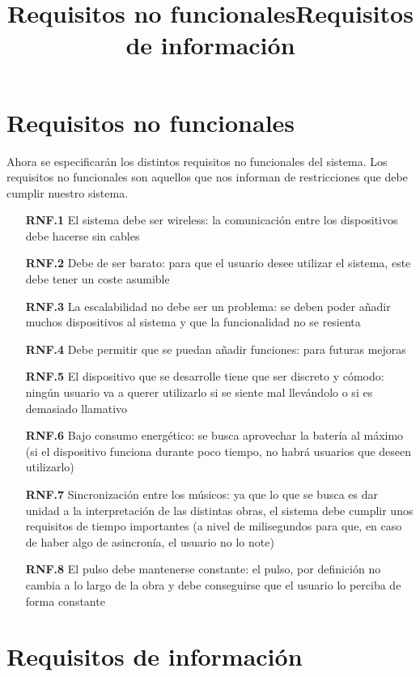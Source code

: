 \title{Requisitos no funcionales}
\section{Requisitos no funcionales}

Ahora se especificarán los distintos requisitos no funcionales del sistema.
Los requisitos no funcionales son aquellos que nos informan de restricciones que debe cumplir
nuestro sistema.\\


\begin{itemize}
    \item[\textbf{RNF.1}] El sistema debe ser wireless: la comunicación entre los
      dispositivos debe hacerse sin cables
    \item[\textbf{RNF.2}] Debe de ser barato: para que el usuario desee utilizar
      el sistema, este debe tener un coste asumible
    \item[\textbf{RNF.3}] La escalabilidad no debe ser un problema: se deben poder añadir
      muchos dispositivos al sistema y que la funcionalidad no se resienta
    \item[\textbf{RNF.4}] Debe permitir que se puedan añadir funciones: para futuras mejoras
    \item[\textbf{RNF.5}] El dispositivo que se desarrolle tiene que ser discreto y cómodo:
      ningún usuario va a querer utilizarlo si se siente mal llevándolo o si es demasiado llamativo
    \item[\textbf{RNF.6}] Bajo consumo energético: se busca aprovechar la batería al máximo
      (si el dispositivo funciona durante poco tiempo, no habrá usuarios que deseen utilizarlo)
    \item[\textbf{RNF.7}] Sincronización entre los músicos: ya que lo que se busca es dar unidad
      a la interpretación de las distintas obras, el sistema debe cumplir unos requisitos de tiempo
      importantes (a nivel de milisegundos para que, en caso de haber algo de asincronía, el usuario no lo note)
    \item[\textbf{RNF.8}] El pulso debe mantenerse constante: el pulso, por definición
      no cambia a lo largo de la obra y debe conseguirse que el usuario lo perciba de forma
      constante
\end{itemize}


\title{Requisitos de información}
\section{Requisitos de información}

